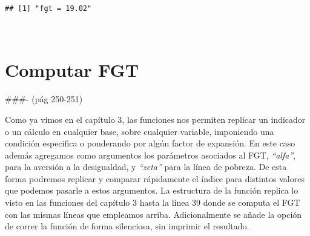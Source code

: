 \documentclass[
]{book}
\newenvironment{Shaded}{\begin{snugshade}}{\end{snugshade}}
\newcommand{\AttributeTok}[1]{\textcolor[rgb]{0.77,0.63,0.00}{#1}}
\newcommand{\CommentTok}[1]{\textcolor[rgb]{0.56,0.35,0.01}{\textit{#1}}}
\newcommand{\ConstantTok}[1]{\textcolor[rgb]{0.00,0.00,0.00}{#1}}
\newcommand{\DecValTok}[1]{\textcolor[rgb]{0.00,0.00,0.81}{#1}}
\newcommand{\FunctionTok}[1]{\textcolor[rgb]{0.00,0.00,0.00}{#1}}
\newcommand{\NormalTok}[1]{#1}
\newcommand{\OtherTok}[1]{\textcolor[rgb]{0.56,0.35,0.01}{#1}}
\newcommand{\SpecialCharTok}[1]{\textcolor[rgb]{0.00,0.00,0.00}{#1}}
\newcommand{\StringTok}[1]{\textcolor[rgb]{0.31,0.60,0.02}{#1}}
\begin{document}
\begin{Shaded}
\end{Shaded}

\begin{verbatim}
## [1] "fgt = 19.02"
\end{verbatim}

~

\hypertarget{computar-fgt}{%
\section{Computar FGT}\label{computar-fgt}}

\#\#\#- (pág 250-251)

Como ya vimos en el capítulo 3, las funciones nos permiten replicar un indicador o un cálculo en cualquier base, sobre cualquier variable, imponiendo una condición especifica o ponderando por algún factor de expansión. En este caso además agregamos como argumentos los parámetros asociados al FGT, \emph{``alfa''}, para la aversión a la desigualdad, y \emph{``zeta''} para la línea de pobreza. De esta forma podremos replicar y comparar rápidamente el índice para distintos valores que podemos pasarle a estos argumentos. La estructura de la función replica lo visto en las funciones del capítulo 3 hasta la línea 39 donde se computa el FGT con las mismas líneas que empleamos arriba. Adicionalmente se añade la opción de correr la función de forma silenciosa, sin imprimir el resultado.
\end{document}
